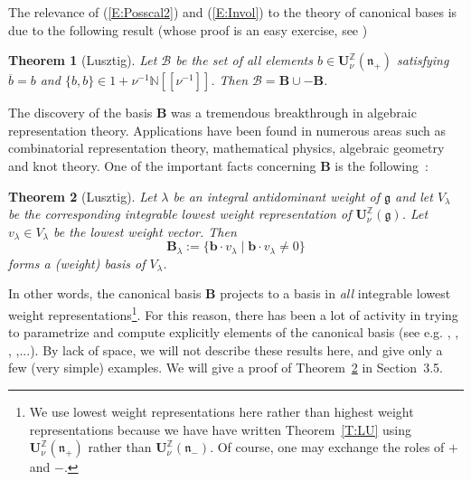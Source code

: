 \documentclass[a4paper,10pt]{amsart}
\def\Z{\mathbb{Z}}
\def\U{\mathbf{U}}
\def\N{\mathbb{N}}
\def\g{\mathfrak{g}}
\def\n{\mathfrak{n}}
\newtheorem{theo}{\bf{Theorem}}[section]
\numberwithin{equation}{section}
\begin{document}
\vspace{.1in}

The relevance of (\ref{E:Posscal2}) and (\ref{E:Invol}) to the theory of canonical bases is due to the following result (whose proof is an easy exercise, see \cite[Thm. 14.2.3.]{Lusbook})

\vspace{.1in}

\begin{theo}[Lusztig] Let $\mathcal{B}$ be the set of all elements $b \in \U_{\nu}^{\Z}(\n_+)$ satisfying $\overline{b}=b$ and $\{b,b\} \in 1 + \nu^{-1}\N[[\nu^{-1}]]$.
Then $\mathcal{B}=\mathbf{B} \cup -\mathbf{B}$.
\end{theo}

\vspace{.1in}

The discovery of the basis $\mathbf{B}$ was a tremendous breakthrough in algebraic representation theory. Applications have been found in numerous areas such as combinatorial representation theory, mathematical physics, algebraic geometry and knot theory. One of the important facts concerning $\mathbf{B}$ is the following~:

\vspace{.1in}

\begin{theo}[Lusztig]\label{T:Rep} Let $\lambda$ be an integral antidominant weight of $\g$ and let $V_{\lambda}$ be the corresponding integrable lowest weight representation of $\U^{\Z}_\nu(\g)$. Let $v_{\lambda} \in V_{\lambda}$ be the lowest weight vector. Then 
$$\mathbf{B}_{\lambda}:=\big\{ \mathbf{b} \cdot v_{\lambda}\;|\; \mathbf{b} \cdot v_{\lambda} \neq 0\big\}$$
forms a (weight) basis of $V_{\lambda}$.
\end{theo}

In other words, the canonical basis $\mathbf{B}$ projects to a basis in \textit{all} integrable lowest weight representations\footnote{We use lowest weight representations here rather than highest weight representations because we have have written Theorem~\ref{T:LU} using $\U^{\Z}_{\nu}(\n_+)$ rather than $\U^{\Z}_{\nu}(\n_-)$. Of course, one may exchange the roles of $+$ and $-$.}. For this reason, there has been a lot of activity in trying to parametrize and compute explicitly elements of the canonical basis (see e.g. \cite{Lusbook}, \cite{Lusparam}, \cite{Kashparam}, \cite{Marsh},...). By lack of space, we will not describe these results here, and give only a few (very simple) examples. We will give a proof of Theorem~\ref{T:Rep} in Section~3.5.
\end{document}
